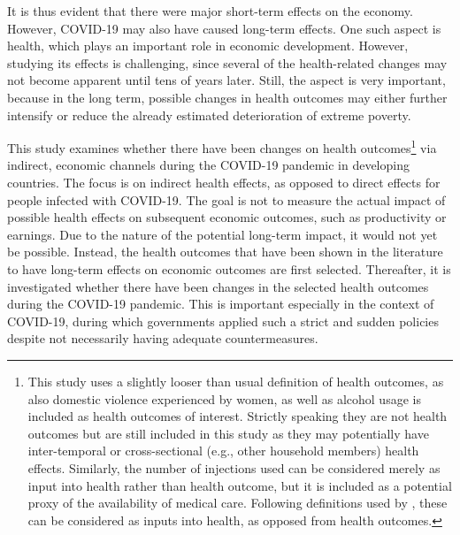 \documentclass[12pt,a4paper,notitlepage]{article}
\begin{document}
It is thus evident that there were major short-term effects on the economy. However, COVID-19 may also have caused long-term effects. One such aspect is health, which plays an important role in economic development. However, studying its effects is challenging, since several of the health-related changes may not become apparent until tens of years later. Still, the aspect is very important, because in the long term, possible changes in health outcomes may either further intensify or reduce the already estimated deterioration of extreme poverty.

This study examines whether there have been changes on health outcomes\footnote{This study uses a slightly looser than usual definition of health outcomes, as also domestic violence experienced by women, as well as alcohol usage is included as health outcomes of interest. Strictly speaking they are not health outcomes but are still included in this study as they may potentially have inter-temporal or cross-sectional (e.g., other household members) health effects. Similarly, the number of injections used can be considered merely as input into health rather than health outcome, but it is included as a potential proxy of the availability of medical care. Following definitions used by \citet{Weil2007}, these can be considered as inputs into health, as opposed from health outcomes.} via indirect, economic channels during the COVID-19 pandemic in developing countries. The focus is on indirect health effects, as opposed to direct effects for people infected with COVID-19. The goal is not to measure the actual impact of possible health effects on subsequent economic outcomes, such as productivity or earnings. Due to the nature of the potential long-term impact, it would not yet be possible. Instead, the health outcomes that have been shown in the literature to have long-term effects on economic outcomes are first selected. Thereafter, it is investigated whether there have been changes in the selected health outcomes during the COVID-19 pandemic. This is important especially in the context of COVID-19, during which governments applied such a strict and sudden policies despite not necessarily having adequate countermeasures.
\end{document}
